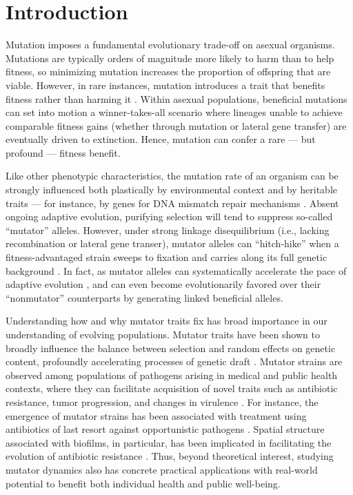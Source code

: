 \section{Introduction} \label{sec:introduction}

Mutation imposes a fundamental evolutionary trade-off on asexual organisms.
Mutations are typically orders of magnitude more likely to harm than to help fitness, so minimizing mutation increases the proportion of offspring that are viable.
However, in rare instances, mutation introduces a trait that benefits fitness rather than harming it \citep{zeyl2004capturing,rozen2002fitness} .
Within asexual populations, beneficial mutations can set into motion a winner-takes-all scenario where lineages unable to achieve comparable fitness gains (whether through mutation or lateral gene transfer) are eventually driven to extinction.
Hence, mutation can confer a rare --- but profound --- fitness benefit.

Like other phenotypic characteristics, the mutation rate of an organism can be strongly influenced both plastically by environmental context \citep{ram2012evolution} and by heritable traits --- for instance, by genes for DNA mismatch repair mechanisms \citep{miller1998mutators}.
Absent ongoing adaptive evolution, purifying selection will tend to suppress so-called ``mutator'' alleles.
However, under strong linkage disequilibrium (i.e., lacking recombination or lateral gene transer), mutator alleles can  ``hitch-hike'' when a fitness-advantaged strain sweeps to fixation and carries along its full genetic background \citep{smith1974hitchhiking,johnson1999beneficial,gentile2011competition}.
In fact, as mutator alleles can systematically accelerate the pace of adaptive evolution \citep{orr2000rate}, and can even become evolutionarily favored over their ``nonmutator'' counterparts by generating linked beneficial alleles.

Understanding how and why mutator traits fix has broad importance in our understanding of evolving populations.
Mutator traits have been shown to broadly influence the balance between selection and random effects on genetic content, profoundly accelerating processes of genetic draft \citep{couce2017mutator}.
Mutator strains are observed among populations of pathogens arising in medical and public health contexts, where they can facilitate acquisition of novel traits such as antibiotic resistance, tumor progression, and changes in virulence \citep{eliopoulos2003hypermutation,jolivetgougeon2011bacterial,stern2016viral,schlesner2015hypermutation,hammerstrom2015acinetobacter,perron2010hypermutability}.
For instance, the emergence of mutator strains has been associated with treatment using antibiotics of last resort against opportunistic pathogens \citep{mehta2019essential}.
Spatial structure associated with biofilms, in particular, has been implicated in facilitating the evolution of antibiotic resistance \citep{france2018spatial}.
Thus, beyond theoretical interest, studying mutator dynamics also has concrete practical applications with real-world potential to benefit both individual health and public well-being.

